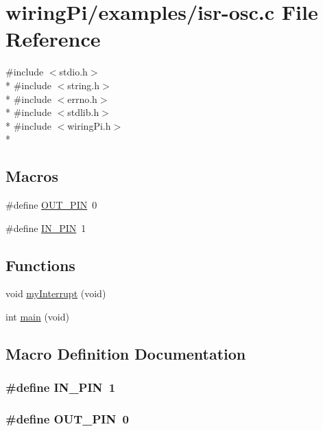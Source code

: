 \hypertarget{isr-osc_8c}{\section{wiring\-Pi/examples/isr-\/osc.c File Reference}
\label{isr-osc_8c}
}
{\ttfamily \#include $<$stdio.\-h$>$}\\*
{\ttfamily \#include $<$string.\-h$>$}\\*
{\ttfamily \#include $<$errno.\-h$>$}\\*
{\ttfamily \#include $<$stdlib.\-h$>$}\\*
{\ttfamily \#include $<$wiring\-Pi.\-h$>$}\\*
\subsection*{Macros}
\begin{DoxyCompactItemize}
\item 
\#define \hyperlink{isr-osc_8c_a4077bef57f7b230360d3c9fd61abe7b7}{O\-U\-T\-\_\-\-P\-I\-N}~0
\item 
\#define \hyperlink{isr-osc_8c_a60b33d9150268a92dd1efd31581c1e2b}{I\-N\-\_\-\-P\-I\-N}~1
\end{DoxyCompactItemize}
\subsection*{Functions}
\begin{DoxyCompactItemize}
\item 
void \hyperlink{isr-osc_8c_a98bf4f02628356fc7afd1123bd9c1323}{my\-Interrupt} (void)
\item 
int \hyperlink{isr-osc_8c_a840291bc02cba5474a4cb46a9b9566fe}{main} (void)
\end{DoxyCompactItemize}


\subsection{Macro Definition Documentation}
\hypertarget{isr-osc_8c_a60b33d9150268a92dd1efd31581c1e2b}{
\subsubsection[{I\-N\-\_\-\-P\-I\-N}]{\setlength{\rightskip}{0pt plus 5cm}\#define I\-N\-\_\-\-P\-I\-N~1}}\label{isr-osc_8c_a60b33d9150268a92dd1efd31581c1e2b}
\hypertarget{isr-osc_8c_a4077bef57f7b230360d3c9fd61abe7b7}{
\subsubsection[{O\-U\-T\-\_\-\-P\-I\-N}]{\setlength{\rightskip}{0pt plus 5cm}\#define O\-U\-T\-\_\-\-P\-I\-N~0}}\label{isr-osc_8c_a4077bef57f7b230360d3c9fd61abe7b7}


